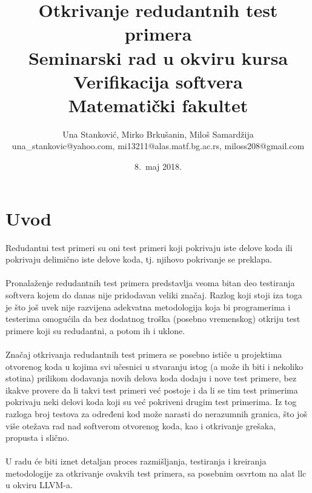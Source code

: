 \documentclass[a4paper]{article}
\begin{document}
\title{Otkrivanje redudantnih test primera\\ \small{Seminarski rad u okviru kursa\\Verifikacija softvera\\ Matematički fakultet}}

\author{Una Stanković, Mirko Brkušanin, Miloš Samardžija\\ una\_stankovic@yahoo.com, mi13211@alas.matf.bg.ac.rs, miloss208@gmail.com}
\date{8.~maj 2018.}
\maketitle


\tableofcontents

\newpage

\section{Uvod}
\label{sec:introduction}
Redudantni test primeri su oni test primeri koji pokrivaju iste delove koda ili pokrivaju delimično iste delove koda, tj. njihovo pokrivanje se preklapa.\\\\
Pronalaženje redudantnih test primera predstavlja veoma bitan deo testiranja softvera kojem do danas nije pridodavan veliki značaj. Razlog koji stoji iza toga je što još uvek nije razvijena adekvatna metodologija koja bi programerima i testerima omogućila da bez dodatnog troška (posebno vremenskog) otkriju test primere koji su redudantni, a potom ih i uklone.\\\\
Značaj otkrivanja redudantnih test primera se posebno ističe u projektima otvorenog koda u kojima svi učesnici u stvaranju istog (a može ih biti i nekoliko stotina) prilikom dodavanja novih delova koda dodaju i nove test primere, bez ikakve provere da li takvi test primeri već postoje i da li se tim test primerima pokrivaju neki delovi koda koji su već pokriveni drugim test primerima. Iz tog razloga broj testova za određeni kod može narasti do nerazumnih granica, što još više otežava rad nad softverom otvorenog koda, kao i otkrivanje grešaka, propusta i slično. \\\\
U radu će biti iznet detaljan proces razmišljanja, testiranja i kreiranja metodologije za otkrivanje ovakvih test primera, sa posebnim osvrtom na alat llc u okviru LLVM-a. 
\end{document}
